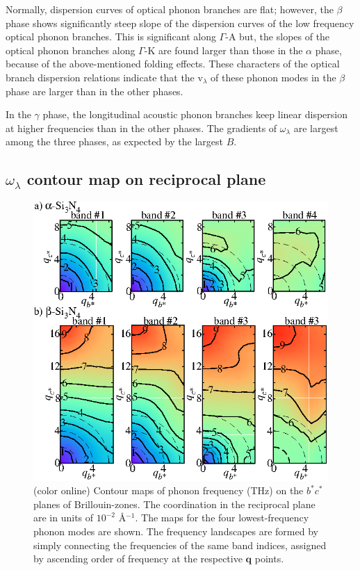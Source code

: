 \documentclass[twocolumn,amsmath,amssymb,a4paper,prb,superscriptaddress,floatfix]{revtex4-1}
\begin{document}
Normally, dispersion curves of optical phonon branches are flat; however, the
$\beta$ phase shows significantly steep slope of the dispersion curves of the
low frequency optical phonon branches.  This is significant along $\Gamma$-A
but, the slopes of the optical phonon branches along $\Gamma$-K are found larger
than those in the $\alpha$ phase, because of the above-mentioned folding
effects. These characters of the optical branch dispersion relations indicate
that the \rm{v}$_{\lambda}$ of these phonon modes in the $\beta$ phase are
larger than in the other phases.

In the $\gamma$ phase, the longitudinal acoustic phonon branches keep linear
dispersion at higher frequencies than in the other phases.  The gradients of
$\omega_\lambda$ are largest among the three phases, as expected by the largest
$B$.

\subsection{$\omega_\lambda$ contour map on reciprocal plane}

\begin{figure}[ht]
 \centerins
  \includegraphics[width=\linewidth]{Fig2_small.eps} \caption{(color
  online) Contour maps of phonon frequency (THz) on the $b^*c^*$
  planes of Brillouin-zones. The coordination in the reciprocal plane 
   are in units of $10^{-2}$ \AA$^{-1}$. The maps for the four lowest-frequency
  phonon modes are shown. The frequency landscapes are formed by simply
  connecting the frequencies of the same band indices, assigned by
  ascending order of frequency at the respective $\mathbf {q}$
  points. \label{fig:Fig3_338} }
 \centering
\end{figure}
\end{document}
